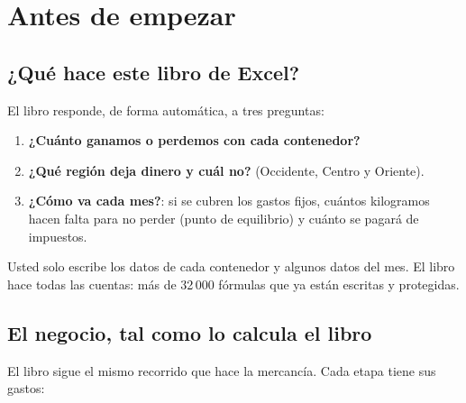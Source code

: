 \chapter{Antes de empezar}

\section{¿Qué hace este libro de Excel?}

El libro responde, de forma automática, a tres preguntas:

\begin{enumerate}
  \item \textbf{¿Cuánto ganamos o perdemos con cada contenedor?}
  \item \textbf{¿Qué región deja dinero y cuál no?} (Occidente, Centro y Oriente).
  \item \textbf{¿Cómo va cada mes?}: si se cubren los gastos fijos, cuántos kilogramos hacen falta para no perder (punto de equilibrio)
        y cuánto se pagará de impuestos.
\end{enumerate}

Usted solo escribe los datos de cada contenedor y algunos datos del mes. El libro hace todas las cuentas: más de
32\,000 fórmulas que ya están escritas y protegidas.

\section{El negocio, tal como lo calcula el libro}

El libro sigue el mismo recorrido que hace la mercancía. Cada etapa tiene sus gastos:


